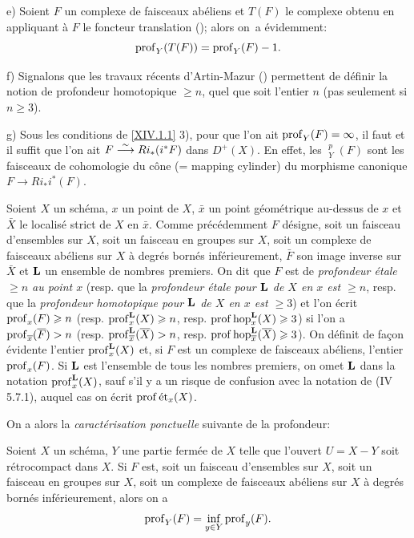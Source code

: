 \begin{remarques}
e) Soient $F$ un complexe de faisceaux ab\'eliens et $T(F)$ le complexe obtenu en appliquant \`a $F$ le foncteur translation (\cite{XIV.3}); alors on~a \'evidemment:
$$
\operatorname{prof}_Y(T(F))=\operatorname{prof}_Y(F)-1.
$$

f) Signalons que les travaux r\'ecents d'Artin-Mazur (\cite{XIV.1}) permettent de d\'efinir la notion de profondeur homotopique $\geq n$, quel que soit l'entier $n$ (pas seulement si $n\geq 3$).

g) Sous les conditions de \ref{XIV.1.1} 3), pour que l'on ait $\operatorname{prof}_Y(F)=\infty$, il faut et il suffit que l'on ait $F\overset{\sim}{\longrightarrow} Ri_*(i^*F)$ dans $D^+(X)$. En effet, les ${\mathop{\underline{\mathrm{H}}}\nolimits}_Y^p(F)$ sont les faisceaux de cohomologie du c\^{o}ne (= mapping cylinder) du morphisme canonique $F\to Ri_*i^*(F)$.
\end{remarques}

\begin{definition} \label{XIV.1.7}
Soient $X$ un sch\'ema, $x$ un point de $X$, $\bar x$ un point g\'eom\'etrique au-dessus de $x$ et $\bar X$ le localis\'e strict de $X$ en $\bar x$. Comme pr\'ec\'edemment $F$ d\'esigne, soit un faisceau d'ensembles sur $X$, soit un faisceau en groupes sur $X$, soit un complexe de faisceaux ab\'eliens sur $X$ \`a degr\'es born\'es inf\'erieurement, $\bar F$ son image inverse sur~$\bar X$ et $\mathbf{L}$ un ensemble de nombres premiers. On dit que $F$ est de \emph{profondeur étale $\geq n$ au point $x$} (resp. que la \emph{profondeur étale pour $\mathbf{L}$ de $X$ en $x$ est $\geq n$}, resp. que la \emph{profondeur homotopique pour $\mathbf{L}$ de $X$ en $x$ est $\geq 3$}) et l'on \'ecrit $\operatorname{prof}_x(F)\geqslant n$ (resp. $\operatorname{prof}_x^{\mathbf{L}}(X)\geqslant n$, resp. $\operatorname{prof} \operatorname{hop}_x^{\mathbf{L}}(X)\geqslant 3$) si l'on a $\operatorname{prof}_{\overline x}(\overline F)>n$ (resp. $\operatorname{prof}_{\overline x}^{\mathbf{L}}(\overline X)> n$, resp. $\operatorname{prof} \operatorname{hop}_{\overline x}^{\mathbf{L}}(\overline X)\geqslant 3$). On d\'efinit de fa\c con \'evidente l'entier $\operatorname{prof}_x^{\mathbf{L}}(X)$ et, si $F$ est un complexe de faisceaux ab\'eliens, l'entier $\operatorname{prof}_x(F)$. Si $\mathbf{L}$ est l'ensemble de tous les nombres premiers, on omet $\mathbf{L}$ dans la notation $\operatorname{prof}_x^{\mathbf{L}}(X)$, sauf s'il y a un risque de confusion avec la notation de \textup{(\EGA IV 5.7.1)}, auquel cas on \'ecrit $\operatorname{prof} {\textup{ét}}_x(X)$.
\end{definition}

On a alors la \textit{caractérisation ponctuelle} suivante de la profondeur:

\begin{theoreme} \label{XIV.1.8} Soient $X$ un sch\'ema, $Y$ une partie ferm\'ee de $X$ telle que l'ouvert $U=X-Y$ soit r\'etrocompact dans $X$. Si $F$ est, soit un faisceau d'ensembles sur $X$, soit un faisceau en groupes sur $X$, soit un complexe de faisceaux ab\'eliens sur $X$ \`a degr\'es born\'es inf\'erieurement, alors on a
$$
\operatorname{prof}_Y(F)=\inf_{y\in Y} \operatorname{prof}_y(F).
$$
\end{theoreme}


